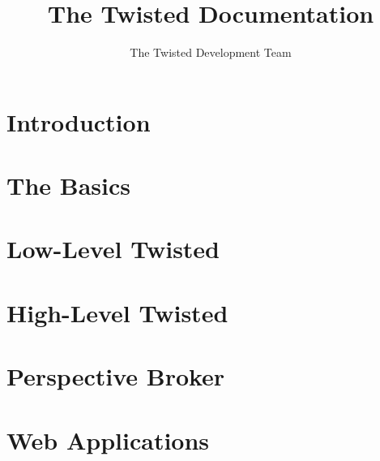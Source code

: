 \documentclass[oneside]{book}
\title{The Twisted Documentation}
\author{The Twisted Development Team}
\begin{document}
\maketitle
\tableofcontents

\chapter{Introduction}












\chapter{The Basics}







\chapter{Low-Level Twisted }













\chapter{High-Level Twisted}











\chapter{Perspective Broker}







\chapter{Web Applications}





\end{document}
